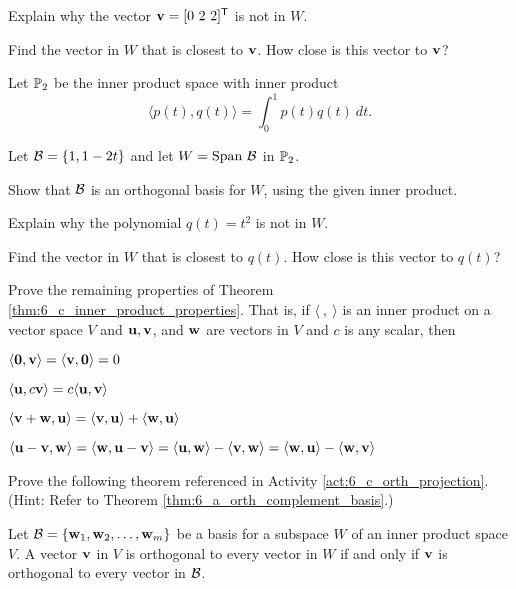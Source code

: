     \item Explain why the vector $\vv = [0 \ 2 \ 2]^{\tr}$ is not in $W$.
    
    \item Find the vector in $W$ that is closest to $\mathbf{v}$. How close is this vector to $\mathbf{v}$?
    
    \ea 
    
\item  Let $\mathbb{P}_2$ be the inner product space with inner product
\[\langle p(t), q(t) \rangle = \int_0^1 p(t)q(t) \ dt.\]

Let $\mathcal{B} = \{1, 1-2t\}$ and let $W = \text{Span} \ \mathcal{B}$ in $\mathbb{P}_2$. 
   \ba
    \item Show that $\mathcal{B}$ is an orthogonal basis for $W$, using the given inner product. 
    
    \item Explain why the polynomial $q(t) = t^2$ is not in $W$.
    
    \item Find the vector in $W$ that is closest to $q(t)$. How close is this vector to $q(t)$?
    
    \ea 
    
\item Prove the remaining properties of Theorem \ref{thm:6_c_inner_product_properties}. That is, if $\langle \ , \ \rangle$ is an inner product on a vector space $V$ and $\mathbf{u}, \mathbf{v}$, and $\mathbf{w}$ are vectors in $V$ and $c$ is any scalar, then
	\be
	\item $\langle \mathbf{0} , \mathbf{v} \rangle = \langle \mathbf{v} , \mathbf{0} \rangle = 0$
	\item $\langle \mathbf{u} , c\mathbf{v} \rangle = c\langle \mathbf{u} , \mathbf{v} \rangle$
	\item $\langle \mathbf{v}+\mathbf{w} , \mathbf{u} \rangle = \langle \mathbf{v} , \mathbf{u} \rangle + \langle \mathbf{w} , \mathbf{u} \rangle$
\item $\langle \mathbf{u} - \mathbf{v}, \mathbf{w} \rangle = \langle \mathbf{w}, \mathbf{u} - \mathbf{v} \rangle= \langle \mathbf{u} , \mathbf{w} \rangle - \langle \mathbf{v} , \mathbf{w} \rangle= \langle \mathbf{w}, \mathbf{u} \rangle - \langle \mathbf{w}, \mathbf{v} \rangle$
	\ee


\item \label{ex:6_c_orth_complement_basis} Prove the following theorem referenced in Activity \ref{act:6_c_orth_projection}. (Hint: Refer to Theorem \ref{thm:6_a_orth_complement_basis}.)

\begin{theorem} \label{thm:6_a_orth_complement_basis} Let $\mathcal{B} = \{\mathbf{w}_1, \mathbf{w}_2, \ldots, \mathbf{w}_m\}$ be a basis for a subspace $W$ of an inner product space $V$. A vector $\mathbf{v}$ in $V$ is orthogonal to every vector in $W$ if and only if $\mathbf{v}$ is orthogonal to every vector in $\mathcal{B}$.
\end{theorem}


